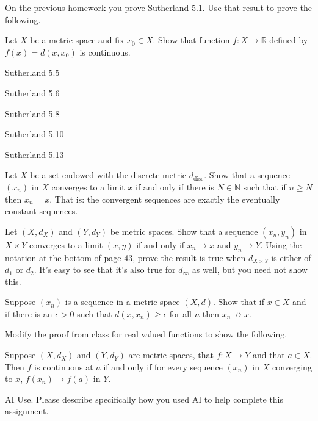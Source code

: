 \documentclass[minion]{homework}
\newcommand{\Reals}{\ensuremath{\mathbb R}}%
\newcommand{\Nats}{\ensuremath{\mathbb N}} %
\begin{document}
\begin{problems}

\problem On the previous homework you prove Sutherland 5.1.  Use that result to prove the following.

Let $X$ be a metric space and fix $x_0\in X$.  Show that function $f:X\to\Reals$
defined by $f(x) = d(x,x_0)$ is continuous.

\problem Sutherland 5.5

\problem Sutherland 5.6

\problem Sutherland 5.8

\problem Sutherland 5.10

\problem Sutherland 5.13

\problem Let $X$ be a set endowed with the discrete metric $d_{\mathrm{disc}}$.
Show that a sequence $(x_n)$ in $X$ converges to a limit $x$ if and only
if there is $N\in \Nats$ such that if $n\ge N$ then $x_n = x$.  
That is: the convergent sequences are exactly the eventually constant sequences.

\problem Let $(X,d_X)$ and $(Y,d_Y)$ be metric spaces.  Show that
a sequence $(x_n,y_n)$ in $X\times Y$ converges to a limit $(x,y)$
if and only if $x_n\to x$ and $y_n\to Y$. Using the notation 
at the bottom of page 43, prove the result 
is true when $d_{X\times Y}$ is either of $d_1$ or $d_2$. It's easy to 
see that it's also true for $d_\infty$ as well, but you need not show this.

\problem Suppose $(x_n)$ is a sequence in a metric space $(X,d)$.
Show that if $x\in X$ and if there is an $\epsilon>0$ such
that $d(x,x_n)\ge \epsilon$ for all $n$ then $x_n\not\to x$.

\problem Modify the proof from class for real valued functions to show 
the following. 

Suppose $(X,d_X)$ and $(Y, d_Y)$ are metric spaces, that 
$f:X\to Y$ and that $a\in X$. Then $f$ is continuous at $a$ if and 
only if for every sequence $(x_n)$ in $X$ converging to $x$, $f(x_n)\to f(a)$
in $Y$.

\problem AI Use. Please describe specifically how you used AI to help complete this assignment.

\end{problems}
\end{document}

